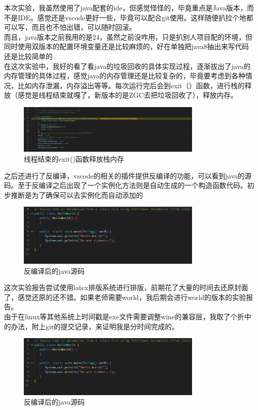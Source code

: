 \documentclass[12pt,a4paper]{article}
\begin{document}
本次实验，我虽然使用了java配套的ide，但感觉怪怪的，毕竟重点是Java版本，而不是IDE。感觉还是vscode更好一些，毕竟可以配合git使用。这样随便扒拉个地都可以写，而且也不怕出错，可以随时回滚。\\
而且，java版本之前我用的是24，虽然之前没咋用，只是扒别人项目配的环境，但同时使用双版本的配置环境变量还是比较麻烦的，好在单独把java8抽出来写代码还是比较简单的\\
在这次实验中，我好的看了看java的垃圾回收的具体实现过程，逐渐拔出了java的内存管理的具体过程，感觉java的内存管理还是比较复杂的，毕竟要考虑到各种情况，比如内存泄漏，内存溢出等等。每次运行完后会到exit（）函数，进行栈的释放（感觉是线程结束就嘎了，新版本的是ZGC去把垃圾回收了），释放内存。\\
    \begin{figure}[H]
    \centering
    \includegraphics[width=0.8\textwidth]{thread.png}
    \caption{线程结束的exit()函数释放栈内存}
    \end{figure}
之后还进行了反编译，vscode的相关的插件提供反编译的功能，可以看到java的源码。至于反编译之后出现了一个实例化方法则是自动生成的一个构造函数代码。初步推断是为了确保可以去实例化而自动添加的
    \begin{figure}[H]
    \centering
    \includegraphics[width=0.8\textwidth]{fanbianyi1.png}
    \caption{反编译后的java源码}
    \end{figure}
这次实验报告尝试使用latex排版系统进行排版，前期花了大量的时间去还原封面了，感觉还原的还不错。如果老师需要world，我后期会进行world的版本的实验报告。\\
由于在linux等其他系统上时间戳是exe文件需要调整wine的兼容层，我取了个折中的办法，附上git的提交记录，来证明我是分时间完成的。
    \begin{figure}[H]
    \centering
    \includegraphics[width=0.8\textwidth]{fanbianyi1.png}
    \caption{反编译后的java源码}
    \end{figure}
\end{document}
